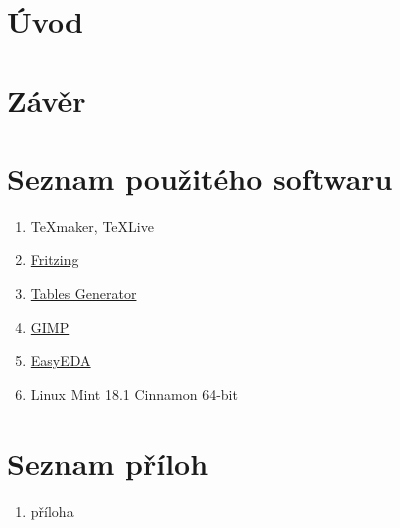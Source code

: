 \documentclass[a4paper,12pt, twoside]{article} %
\begin{document}
\section{Úvod} 
\label{kap:uvod}
%
%
\clearpage
\section{Závěr}
%
\clearpage
\renewcommand{\refname}{Seznam použité literatury a zdrojů informací}
\begin{thebibliography}{99}
%
\end{thebibliography}
\clearpage
{} %
\section*{Seznam použitého softwaru}
\begin{enumerate}%
	\item \TeX maker, \TeX Live
	\item \href{http://fritzing.org/home/}{Fritzing}
	\item \href{https://www.tablesgenerator.com/latex_tables}{Tables Generator}
	\item \href{https://www.gimp.org/}{GIMP}
	\item \href{https://easyeda.com/}{EasyEDA}
	\item Linux Mint 18.1 Cinnamon 64-bit
\end{enumerate}
\section*{Seznam příloh} 
\begin{enumerate}[{Příloha} 1:]
\item příloha
\end{enumerate}
\end{document}
